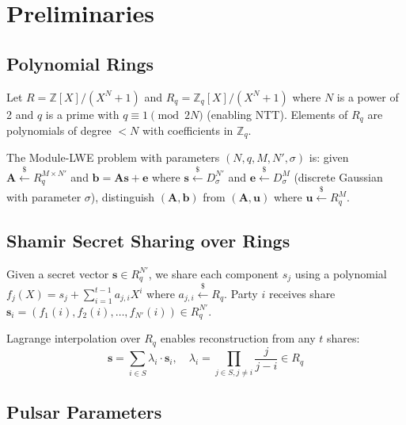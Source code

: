 \section{Preliminaries}

\label{sec:prelim}

\subsection{Polynomial Rings}

Let $R = \mathbb{Z}[X]/(X^N + 1)$ and $R_q = \mathbb{Z}_q[X]/(X^N + 1)$ where $N$ is
a power of 2 and $q$ is a prime with $q \equiv 1 \pmod{2N}$ (enabling NTT). Elements
of $R_q$ are polynomials of degree $< N$ with coefficients in $\mathbb{Z}_q$.

\begin{definition}
The Module-LWE problem with parameters $(N, q, M, N', \sigma)$ is: given
$\mathbf{A} \stackrel{\$}{\leftarrow} R_q^{M \times N'}$ and $\mathbf{b} = \mathbf{A}\mathbf{s} + \mathbf{e}$
where $\mathbf{s} \stackrel{\$}{\leftarrow} D_\sigma^{N'}$ and $\mathbf{e} \stackrel{\$}{\leftarrow} D_\sigma^M$
(discrete Gaussian with parameter $\sigma$), distinguish $(\mathbf{A}, \mathbf{b})$ from
$(\mathbf{A}, \mathbf{u})$ where $\mathbf{u} \stackrel{\$}{\leftarrow} R_q^M$.
\end{definition}

\subsection{Shamir Secret Sharing over Rings}

\begin{definition}
Given a secret vector $\mathbf{s} \in R_q^{N'}$, we share each component $s_j$ using a
polynomial $f_j(X) = s_j + \sum_{i=1}^{t-1} a_{j,i} X^i$ where $a_{j,i} \stackrel{\$}{\leftarrow} R_q$.
Party $i$ receives share $\mathbf{s}_i = (f_1(i), f_2(i), \ldots, f_{N'}(i)) \in R_q^{N'}$.
\end{definition}

Lagrange interpolation over $R_q$ enables reconstruction from any $t$ shares:
\begin{equation}
\mathbf{s} = \sum_{i \in S} \lambda_i \cdot \mathbf{s}_i, \quad
\lambda_i = \prod_{j \in S, j \neq i} \frac{j}{j - i} \in R_q
\label{eq:lagrange}
\end{equation}

\subsection{Pulsar Parameters}

